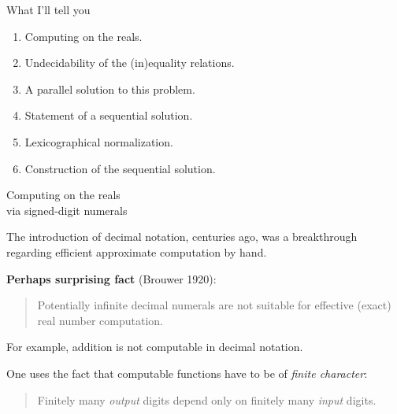 \documentclass{csslides-1.1}
\newcommand{\myemph}[1]{{\it #1}\/}
\begin{document}
  
  



\begin{slide}{What I'll tell you}

\begin{enumerate}
\item Computing on the reals.

\item Undecidability of the (in)equality relations.

\item A parallel solution to this problem.

\item Statement of a sequential solution.
\item Lexicographical normalization.

\item Construction of the sequential solution.
\end{enumerate}

\end{slide}

\begin{slide}{Computing on the reals \\ via 
signed-digit numerals}

\vfill

The introduction of decimal notation, centuries ago, was a
breakthrough regarding efficient approximate computation by hand.

\vfill
  
  {\bf Perhaps surprising fact} (Brouwer 1920):

\begin{quote}
  Potentially infinite decimal numerals are not suitable for effective
  (exact) real number computation.
\end{quote}

For example, addition is not computable in decimal notation.

\vfill

One uses the fact that computable functions have to be of
\myemph{finite character}:
\begin{quote}
Finitely many \myemph{output} digits depend only on finitely many
\myemph{input} digits.
\end{quote}

\vfill

\end{slide}
\end{document}
